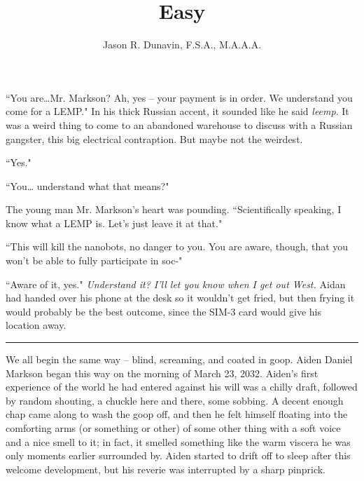 \documentclass[11pt]{book}
\title{Easy}
\author{Jason R. Dunavin, F.S.A., M.A.A.A.}
\begin{document}
	\maketitle
	
	``You are\dots  Mr. Markson? Ah, yes -- your payment is in order. We understand you come for a LEMP." In his thick Russian accent, it sounded like he said \textit{leemp}. It was a weird thing to come to an abandoned warehouse to discuss with a Russian gangster, this big electrical contraption. But maybe not the weirdest.
	
	``Yes."
	
	``You… understand what that means?"
	
	The young man Mr. Markson's heart was pounding. ``Scientifically speaking, I know what a LEMP is. Let's just leave it at that."
	
	``This will kill the nanobots, no danger to you. You are aware, though, that you won't be able to fully participate in soc-"
	
	``Aware of it, yes." \textit{Understand it? I'll let you know when I get out West.} Aidan had handed over his phone at the desk so it wouldn't get fried, but then frying it would probably be the best outcome, since the SIM-3 card would give his location away.
	
	\vspace{0.5cm}
	\hrule
	\vspace{0.5cm}
	
	We all begin the same way -- blind, screaming, and coated in goop. Aiden Daniel Markson began this way on the morning of March 23, 2032. Aiden's first experience of the world he had entered against his will was a chilly draft, followed by random shouting, a chuckle here and there, some sobbing. A decent enough chap came along to wash the goop off, and then he felt himself floating into the comforting arms (or something or other) of some other thing with a  soft voice and a nice smell to it; in fact, it smelled something like the warm viscera he was only moments earlier surrounded by. Aiden started to drift off to sleep after this welcome development, but his reverie was interrupted by a sharp pinprick.
	
\end{document}
